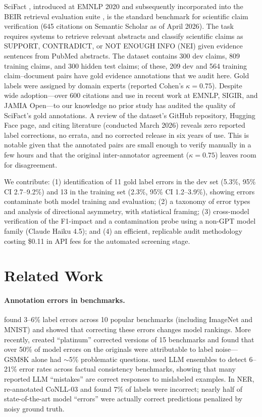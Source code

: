 \documentclass[11pt]{article}
\begin{document}
SciFact \citep{wadden2020fact}, introduced at EMNLP 2020 and subsequently incorporated into the BEIR retrieval evaluation suite \citep{thakur2021beir}, is the standard benchmark for scientific claim verification (645 citations on Semantic Scholar as of April 2026).
The task requires systems to retrieve relevant abstracts and classify scientific claims as SUPPORT, CONTRADICT, or NOT ENOUGH INFO (NEI) given evidence sentences from PubMed abstracts.
The dataset contains 300 dev claims, 809 training claims, and 300 hidden test claims; of these, 209 dev and 564 training claim--document pairs have gold evidence annotations that we audit here.
Gold labels were assigned by domain experts (reported Cohen's $\kappa = 0.75$).
Despite wide adoption---over 600 citations and use in recent work at EMNLP, SIGIR, and JAMIA Open---to our knowledge no prior study has audited the quality of SciFact's gold annotations.
A review of the dataset's GitHub repository, Hugging Face page, and citing literature (conducted March 2026) reveals zero reported label corrections, no errata, and no corrected release in six years of use.
This is notable given that the annotated pairs are small enough to verify manually in a few hours and that the original inter-annotator agreement ($\kappa = 0.75$) leaves room for disagreement.

We contribute: (1) identification of 11 gold label errors in the dev set (5.3\%, 95\% CI 2.7--9.2\%) and 13 in the training set (2.3\%, 95\% CI 1.2--3.9\%), showing errors contaminate both model training and evaluation;
(2) a taxonomy of error types and analysis of directional asymmetry, with statistical framing;
(3) cross-model verification of the F1-impact and a contamination probe using a non-GPT model family (Claude Haiku 4.5);
and (4) an efficient, replicable audit methodology costing \$0.11 in API fees for the automated screening stage.

\section{Related Work}

\paragraph{Annotation errors in benchmarks.}
\citet{northcutt2021pervasive} found 3--6\% label errors across 10 popular benchmarks (including ImageNet and MNIST) and showed that correcting these errors changes model rankings.
More recently, \citet{vendrow2025platinum} created ``platinum'' corrected versions of 15 benchmarks and found that over 50\% of model errors on the originals were attributable to label noise---GSM8K alone had ${\sim}$5\% problematic questions.
\citet{nahum2025llms} used LLM ensembles to detect 6--21\% error rates across factual consistency benchmarks, showing that many reported LLM ``mistakes'' are correct responses to mislabeled examples.
In NER, \citet{rucker2023cleanconll} re-annotated CoNLL-03 and found 7\% of labels were incorrect; nearly half of state-of-the-art model ``errors'' were actually correct predictions penalized by noisy ground truth.
\end{document}

